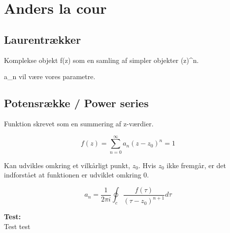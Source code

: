 \chapter{Anders la cour}

\section{Laurentrækker}

Komplekse objekt f(z) som en samling af simpler objekter (z)^n.

a_n vil være vores parametre.


\section{Potensrække / Power series}

Funktion skrevet som en summering af z-værdier. 


\begin{equation*}
       f(z)=\sum_{n=0}^{\infty} a_{n}(z-z_0)^{n} = 1  
\end{equation*}

Kan udvikles omkring et vilkårligt punkt, \(z_0\).
Hvis \(z_0\) ikke fremgår, er det indforstået at funktionen er udviklet omkring 0. 


\begin{equation*}
a_n = \frac{1}{2\pi i} \oint_c \frac{f(\tau)}{(\tau-z_0)^{n+1}} d\tau
\end{equation*}







\begin{tcolorbox}[colback=white!5!white,colframe=blue!75!black]
  \textbf{Test:}\\
Test test
\end{tcolorbox}




